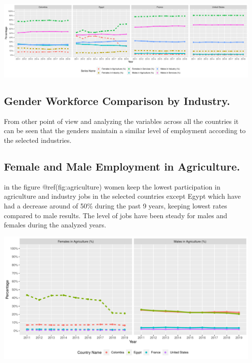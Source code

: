 \documentclass[
]{article}
\begin{document}
\includegraphics{The_Outsiders_5513_files/figure-latex/allcountries-1.pdf}

\hypertarget{gender-workforce-comparison-by-industry.}{%
\subsection{Gender Workforce Comparison by
Industry.}\label{gender-workforce-comparison-by-industry.}}

From other point of view and analyzing the variables across all the
countries it can be seen that the genders maintain a similar level of
employment according to the selected industries.

\hypertarget{female-and-male-employment-in-agriculture.}{%
\subsection{Female and Male Employment in
Agriculture.}\label{female-and-male-employment-in-agriculture.}}

in the figure @ref(fig:agriculture) women keep the lowest participation
in agriculture and industry jobs in the selected countries except Egypt
which have had a decrease around of 50\% during the past 9 years,
keeping lowest rates compared to male results. The level of jobs have
been steady for males and females during the analyzed years.

\includegraphics{The_Outsiders_5513_files/figure-latex/agriculture-1.pdf}
\end{document}

